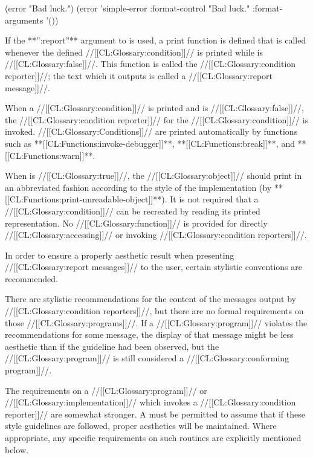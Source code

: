 (error "Bad luck.") \EQ (error 'simple-error :format-control "Bad luck." :format-arguments '()) \endcode

\endsubsubsection%

\endsubsection%
   
  If the **'':report''** argument to  is used, a print function is defined that is called whenever  the defined //[[CL:Glossary:condition]]// is printed while  is //[[CL:Glossary:false]]//.  This function is called the //[[CL:Glossary:condition reporter]]//; the text which it outputs is called a //[[CL:Glossary:report message]]//.

When a //[[CL:Glossary:condition]]// is printed and  is //[[CL:Glossary:false]]//, the //[[CL:Glossary:condition reporter]]// for the //[[CL:Glossary:condition]]// is invoked. //[[CL:Glossary:Conditions]]// are printed automatically by functions such as **[[CL:Functions:invoke-debugger]]**, **[[CL:Functions:break]]**, and **[[CL:Functions:warn]]**.

When  is //[[CL:Glossary:true]]//, the //[[CL:Glossary:object]]// should print in an abbreviated fashion according to the style of the implementation (\eg by **[[CL:Functions:print-unreadable-object]]**).  It is not required that a //[[CL:Glossary:condition]]// can be recreated by reading its printed representation.
  No //[[CL:Glossary:function]]// is provided for directly //[[CL:Glossary:accessing]]//  or invoking //[[CL:Glossary:condition reporters]]//.

In order to ensure a properly aesthetic result when presenting //[[CL:Glossary:report messages]]// to the user, certain stylistic conventions are recommended.

There are stylistic recommendations for the content of the messages output by //[[CL:Glossary:condition reporters]]//, but there are no formal requirements  on those //[[CL:Glossary:programs]]//. If a //[[CL:Glossary:program]]// violates the recommendations for some message, the display of that message might be less aesthetic than if the guideline had been observed, but the //[[CL:Glossary:program]]// is still considered a //[[CL:Glossary:conforming program]]//.

The requirements on a //[[CL:Glossary:program]]// or //[[CL:Glossary:implementation]]// which invokes a //[[CL:Glossary:condition reporter]]// are somewhat stronger.  A  must be permitted to assume that if these style guidelines are followed, proper aesthetics will be maintained.  Where appropriate, any specific requirements on such routines are explicitly mentioned below.

